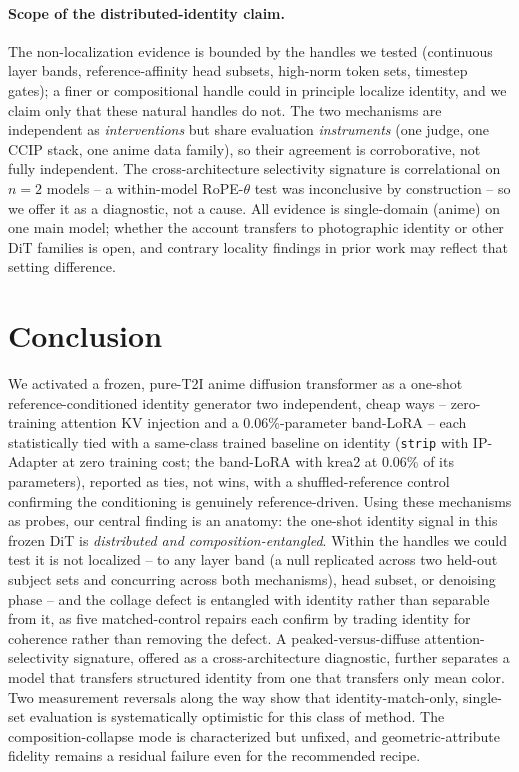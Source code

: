 \paragraph{Scope of the distributed-identity claim.} The
non-localization evidence is bounded by the handles we tested (continuous
layer bands, reference-affinity head subsets, high-norm token sets,
timestep gates); a finer or compositional handle could in principle
localize identity, and we claim only that these natural handles do not.
The two mechanisms are independent as \emph{interventions} but share
evaluation \emph{instruments} (one judge, one CCIP stack, one anime data
family), so their agreement is corroborative, not fully independent. The
cross-architecture selectivity signature is correlational on $n{=}2$
models -- a within-model RoPE-$\theta$ test was inconclusive by
construction -- so we offer it as a diagnostic, not a cause. All evidence
is single-domain (anime) on one main model; whether the account transfers
to photographic identity or other DiT families is open, and contrary
locality findings in prior work may reflect that setting difference.

\section{Conclusion}\label{sec:conclusion}

We activated a frozen, pure-T2I anime diffusion transformer as a
one-shot reference-conditioned identity generator two independent, cheap
ways -- zero-training attention KV injection and a 0.06\%-parameter
band-LoRA -- each statistically tied with a same-class trained baseline
on identity (\texttt{strip} with IP-Adapter at zero training cost; the
band-LoRA with krea2 at 0.06\% of its parameters), reported as ties, not
wins, with a shuffled-reference control confirming the conditioning is
genuinely reference-driven. Using these mechanisms as probes, our central
finding is an anatomy: the one-shot identity signal in this frozen DiT is
\emph{distributed and composition-entangled}. Within the handles we could
test it is not localized -- to any layer band (a null replicated across
two held-out subject sets and concurring across both mechanisms), head
subset, or denoising phase -- and the collage defect is entangled with
identity rather than separable from it, as five matched-control repairs
each confirm by trading identity for coherence rather than removing the
defect. A peaked-versus-diffuse attention-selectivity signature, offered
as a cross-architecture diagnostic, further separates a model that
transfers structured identity from one that transfers only mean color.
Two measurement reversals along the way show that identity-match-only,
single-set evaluation is systematically optimistic for this class of
method. The composition-collapse mode is characterized but unfixed, and
geometric-attribute fidelity remains a residual failure even for the
recommended recipe.
